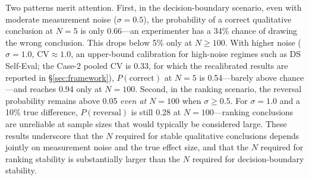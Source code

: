 \documentclass[11pt]{article}
\begin{document}
Two patterns merit attention. First, in the decision-boundary scenario, even with moderate measurement noise ($\sigma{=}0.5$), the probability of a correct qualitative conclusion at $N{=}5$ is only 0.66---an experimenter has a 34\% chance of drawing the wrong conclusion. This drops below 5\% only at $N \geq 100$. With higher noise ($\sigma{=}1.0$, $\text{CV} \approx 1.0$, an upper-bound calibration for high-noise regimes such as DS Self-Eval; the Case-2 pooled CV is $0.33$, for which the recalibrated results are reported in \S\ref{sec:framework}), $P(\text{correct})$ at $N{=}5$ is 0.54---barely above chance---and reaches 0.94 only at $N{=}100$. Second, in the ranking scenario, the reversal probability remains above 0.05 \emph{even at $N{=}100$} when $\sigma \geq 0.5$. For $\sigma{=}1.0$ and a 10\% true difference, $P(\text{reversal})$ is still 0.28 at $N{=}100$---ranking conclusions are unreliable at sample sizes that would typically be considered large. These results underscore that the $N$ required for stable qualitative conclusions depends jointly on measurement noise and the true effect size, and that the $N$ required for ranking stability is substantially larger than the $N$ required for decision-boundary stability.



\end{document}
